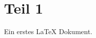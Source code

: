 \documentclass[ngerman]{scrartcl}
\begin{document}
 \section{Teil 1}         
 
 Ein erstes \LaTeX{} Dokument.

 
\end{document}
